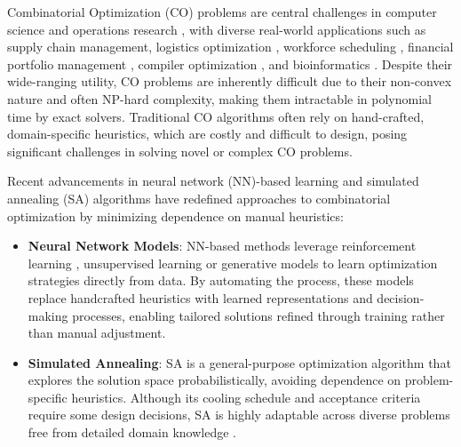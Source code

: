 Combinatorial Optimization (CO) problems are central challenges in computer science and operations research \citep{papadimitriou1998combinatorial}, with diverse real-world applications such as supply chain management, logistics optimization \citep{chopra2001strategy}, workforce scheduling \citep{ernst2004staff}, financial portfolio management \citep{rubinstein2002markowitz,lobo2007portfolio}, compiler optimization \citep{trofin2021mlgo,zheng2022alpa}, and bioinformatics \citep{gusfield1997algorithms}. Despite their wide-ranging utility, CO problems are inherently difficult due to their non-convex nature and often NP-hard complexity, making them intractable in polynomial time by exact solvers.  Traditional CO algorithms often rely on hand-crafted, domain-specific heuristics, which are costly and difficult to design, posing significant challenges in solving novel or complex CO problems.

Recent advancements in neural network (NN)-based learning \citep{bengio2020machine} and simulated annealing (SA) \citep{kirkpatrick1983SA} algorithms  have redefined approaches to combinatorial optimization by minimizing dependence on manual heuristics:
\begin{itemize}
    \item \textbf{Neural Network Models}: NN-based methods leverage reinforcement learning \citep{Khalil2017DQNCO, qiu2022dimes}, unsupervised learning \citep{Karalias2020ErdosGN, wang2022unsupervised, wang2023unsupervised, SanokowskiHL24} or generative models \citep{kool2018attention, zhang2023let, sun2023difusco, li2023from, li2024fast} to learn optimization strategies directly from data. By automating the process, these models replace handcrafted heuristics with learned representations and decision-making processes, enabling tailored solutions refined through training rather than manual adjustment.
    \item \textbf{Simulated Annealing}: SA is a general-purpose optimization algorithm that explores the solution space probabilistically, avoiding dependence on problem-specific heuristics. Although its cooling schedule and acceptance criteria require some design decisions, SA is highly adaptable across diverse problems free from detailed domain knowledge \citep{Johnson1991opsa}.
\end{itemize}

